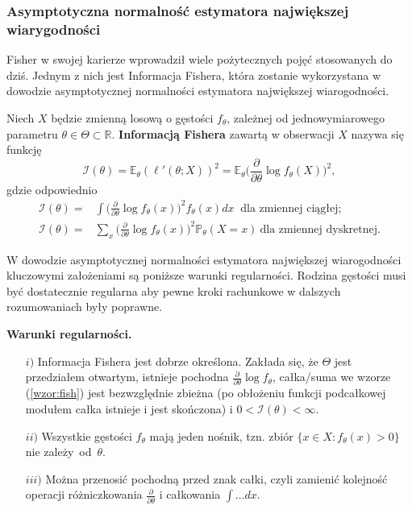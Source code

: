 \newpage
\subsubsection{Asymptotyczna normalność estymatora największej wiarygodności}


Fisher w swojej karierze wprowadził wiele pożytecznych pojęć stosowanych do dziś. Jednym z nich jest Informacja Fishera, która zostanie wykorzystana w dowodzie asymptotycznej normalności estymatora największej wiarogodności.

\begin{definition}\label{inf:fish}
Niech $X$ będzie zmienną losową o gęstości $f_{\theta}$, zależnej od jednowymiarowego parametru $\theta \in \Theta \subset \mathbb{R}$. \textbf{Informacją Fishera} zawartą w obserwacji $X$ nazywa się funkcję
\begin{equation}\label{wzor:fish}
\mathcal{I}(\theta) = \mathbb{E}_{\theta}(\ell'(\theta;X))^2 = \mathbb{E}_{\theta}\Big(\frac{\partial}{\partial\theta}\log f_{\theta}(X) \Big)^2,
\end{equation}
gdzie odpowiednio
\begin{align*}
\mathcal{I}(\theta) = & \int \Big(\frac{\partial}{\partial\theta}\log f_{\theta}(x) \Big)^2 f_{\theta}(x)dx \ \text{\ \ \ \ \ dla zmiennej ciągłej;} \\
\mathcal{I}(\theta) = & \sum\limits_{x}^{ } \Big(\frac{\partial}{\partial\theta}\log f_{\theta}(x) \Big)^2 \mathbb{P}_{\theta}(X=x) \ \text{dla zmiennej dyskretnej}.
\end{align*}
\end{definition}

W dowodzie asymptotycznej normalności estymatora największej wiarogodności kluczowymi założeniami są poniższe warunki regularności. Rodzina gęstości musi być dostatecznie regularna aby pewne kroki rachunkowe w dalszych rozumowaniach były
poprawne.

\begin{definition}\label{def:regur}
\textbf{Warunki regularności.}
\end{definition}
\begin{itemize}
\item[$i)$] Informacja Fishera jest dobrze określona. Zakłada się, że $\Theta$ jest przedziałem
otwartym, istnieje pochodna $\frac{\partial}{\partial\theta}\log f_{\theta}$, całka/suma we wzorze
(\ref{wzor:fish}) jest bezwzględnie zbieżna (po obłożeniu funkcji podcałkowej modułem całka istnieje i jest skończona) i $0 < \mathcal{I}(\theta) < \infty$.
\item[$ii)$] Wszystkie gęstości $f_\theta$ mają jeden nośnik, tzn. zbiór $\{x \in X : f_\theta(x) > 0\}$ nie zależy~od~$\theta$.
\item[$iii)$] Można przenosić pochodną przed znak całki, czyli zamienić kolejność
operacji różniczkowania $\frac{\partial}{\partial\theta}$ i całkowania $\int \dots dx$.
\end{itemize}

